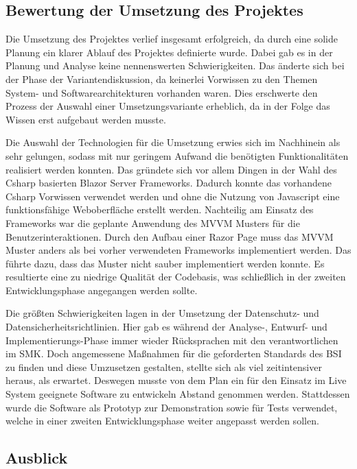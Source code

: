 \subsection{Bewertung der Umsetzung des Projektes}
\label{sec:Bewertung} %
Die Umsetzung des Projektes verlief insgesamt erfolgreich, da durch eine solide Planung ein klarer Ablauf des Projektes definierte wurde. Dabei gab es in der Planung und Analyse keine nennenswerten Schwierigkeiten. Das änderte sich bei der Phase der Variantendiskussion, da keinerlei Vorwissen zu den Themen System- und Softwarearchitekturen vorhanden waren. Dies erschwerte den Prozess der Auswahl einer Umsetzungsvariante erheblich, da in der Folge das Wissen erst aufgebaut werden musste.

Die Auswahl der Technologien für die Umsetzung erwies sich im Nachhinein als sehr gelungen, sodass mit nur geringem Aufwand die benötigten Funktionalitäten realisiert werden konnten. Das gründete sich vor allem Dingen in der Wahl des Csharp basierten Blazor Server Frameworks. Dadurch konnte das vorhandene Csharp Vorwissen verwendet werden und ohne die Nutzung von Javascript eine funktionsfähige Weboberfläche erstellt werden. Nachteilig am Einsatz des Frameworks war die geplante Anwendung des MVVM Musters für die Benutzerinteraktionen. Durch den Aufbau einer Razor Page muss das MVVM Muster anders als bei vorher verwendeten Frameworks implementiert werden. Das führte dazu, dass das Muster nicht sauber implementiert werden konnte. Es resultierte eine zu niedrige Qualität der Codebasis, was schließlich in der zweiten Entwicklungsphase angegangen werden sollte.

Die größten Schwierigkeiten lagen in der Umsetzung der Datenschutz- und Datensicherheitsrichtlinien. Hier gab es während der Analyse-, Entwurf- und Implementierungs-Phase immer wieder Rücksprachen mit den verantwortlichen im SMK. Doch angemessene Maßnahmen für die geforderten Standards des BSI zu finden und diese Umzusetzen gestalten, stellte sich als viel zeitintensiver heraus, als erwartet. Deswegen musste von dem Plan ein für den Einsatz im Live System geeignete Software zu entwickeln Abstand genommen werden. Stattdessen wurde die Software als Prototyp zur Demonstration sowie für Tests verwendet, welche in einer zweiten Entwicklungsphase weiter angepasst werden sollen.

\subsection{Ausblick}
\label{sec:Ausblick}

